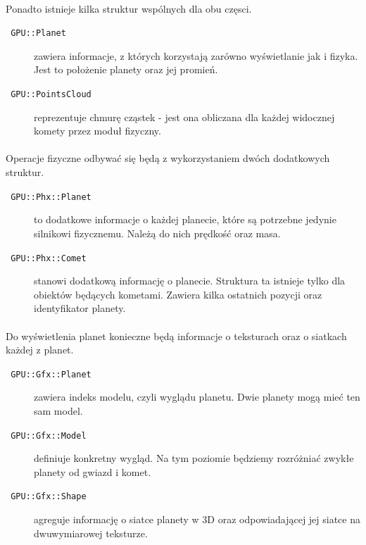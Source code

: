 \paragraph{}
Ponadto istnieje kilka struktur wspólnych dla obu częsci.

\begin{description}
\item[\texttt{ GPU::Planet}] zawiera informacje, z których korzystają zarówno wyświetlanie jak i fizyka. Jest to położenie planety oraz jej promień.
\item[\texttt{ GPU::PointsCloud}] reprezentuje chmurę cząstek - jest ona obliczana dla każdej widocznej komety przez moduł fizyczny.
\end{description}

\paragraph{}

Operacje fizyczne odbywać się będą z wykorzystaniem dwóch dodatkowych struktur.

\begin{description}
\item[\texttt{ GPU::Phx::Planet}] to dodatkowe informacje o każdej planecie, które są potrzebne jedynie silnikowi fizycznemu. Należą do nich prędkość oraz masa.
\item[\texttt{ GPU::Phx::Comet}] stanowi dodatkową informację o planecie. Struktura ta istnieje tylko dla obiektów będących kometami. Zawiera kilka ostatnich pozycji oraz identyfikator planety.
\end{description}

\paragraph{}

Do wyświetlenia planet konieczne będą informacje o teksturach oraz o siatkach każdej z planet.

\begin{description}
\item[\texttt{ GPU::Gfx::Planet}] zawiera indeks modelu, czyli wyglądu planetu. Dwie planety mogą mieć ten sam model.
\item[\texttt{ GPU::Gfx::Model}] definiuje konkretny wygląd. Na tym poziomie będziemy rozróżniać zwykłe planety od gwiazd i komet.
\item[\texttt{ GPU::Gfx::Shape}] agreguje informację o siatce planety w 3D oraz odpowiadającej jej siatce na dwuwymiarowej teksturze.
\end{description}

